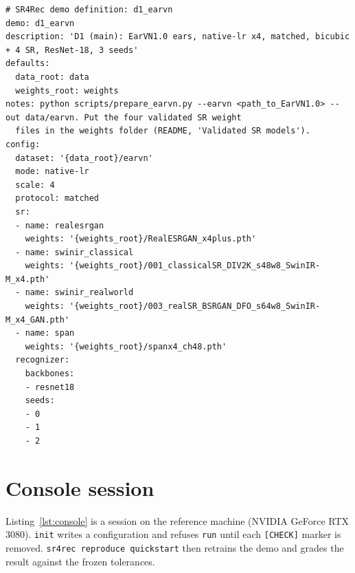 \documentclass[preprint,12pt]{elsarticle}
\begin{document}
\begin{lstlisting}[style=sryaml,caption={Demonstration D1 configuration (\texttt{d1\_earvn.yaml}).},label=lst:d1yaml]
# SR4Rec demo definition: d1_earvn
demo: d1_earvn
description: 'D1 (main): EarVN1.0 ears, native-lr x4, matched, bicubic + 4 SR, ResNet-18, 3 seeds'
defaults:
  data_root: data
  weights_root: weights
notes: python scripts/prepare_earvn.py --earvn <path_to_EarVN1.0> --out data/earvn. Put the four validated SR weight
  files in the weights folder (README, 'Validated SR models').
config:
  dataset: '{data_root}/earvn'
  mode: native-lr
  scale: 4
  protocol: matched
  sr:
  - name: realesrgan
    weights: '{weights_root}/RealESRGAN_x4plus.pth'
  - name: swinir_classical
    weights: '{weights_root}/001_classicalSR_DIV2K_s48w8_SwinIR-M_x4.pth'
  - name: swinir_realworld
    weights: '{weights_root}/003_realSR_BSRGAN_DFO_s64w8_SwinIR-M_x4_GAN.pth'
  - name: span
    weights: '{weights_root}/spanx4_ch48.pth'
  recognizer:
    backbones:
    - resnet18
    seeds:
    - 0
    - 1
    - 2
\end{lstlisting}

\section{Console session}
\label{app:console}
Listing~\ref{lst:console} is a session on the reference machine (NVIDIA GeForce RTX 3080).
\texttt{init} writes a configuration and refuses \texttt{run} until each \texttt{[CHECK]} marker is
removed. \texttt{sr4rec reproduce quickstart} then retrains the demo and grades the result against
the frozen tolerances.
\end{document}
